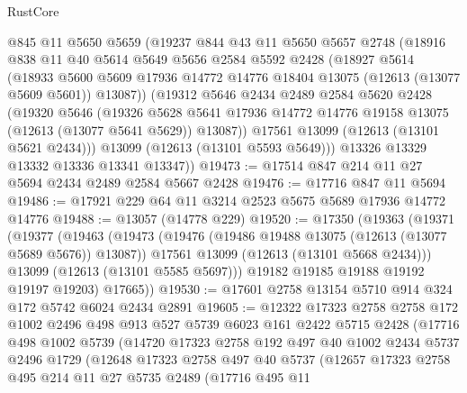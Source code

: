 \begin{lexlean}{RustCore}
\begin{coremodule}
      @845
      @11
      @5650
      @5659
      (@19237
        @844
        @43
        @11
        @5650
        @5657
        @2748
        (@18916
          @838
          @11
          @40
          @5614
          @5649
          @5656
          @2584
          @5592
          @2428
          (@18927
            @5614
            (@18933
              @5600
              @5609
              @17936
              @14772
              @14776
              @18404
              @13075
              (@12613 (@13077 @5609 @5601))
              @13087))
          (@19312
            @5646
            @2434
            @2489
            @2584
            @5620
            @2428
            (@19320
              @5646
              (@19326
                @5628
                @5641
                @17936
                @14772
                @14776
                @19158
                @13075
                (@12613 (@13077 @5641 @5629))
                @13087))
            @17561
            @13099
            (@12613 (@13101 @5621 @2434)))
          @13099
          (@12613 (@13101 @5593 @5649)))
        @13326
        @13329
        @13332
        @13336
        @13341
        @13347))
@19473 := @17514 @847 @214 @11 @27 @5694 @2434 @2489 @2584 @5667 @2428
@19476 := @17716 @847 @11 @5694
@19486 := @17921 @229 @64 @11 @3214 @2523 @5675 @5689 @17936 @14772 @14776
@19488 := @13057 (@14778 @229)
@19520 := @17350
    (@19363
      (@19371
        (@19377
          (@19463
            (@19473
              (@19476 (@19486 @19488 @13075 (@12613 (@13077 @5689 @5676)) @13087))
              @17561
              @13099
              (@12613 (@13101 @5668 @2434)))
            @13099
            (@12613 (@13101 @5585 @5697)))
          @19182
          @19185
          @19188
          @19192
          @19197
          @19203)
        @17665))
@19530 := @17601 @2758 @13154 @5710 @914 @324 @172 @5742 @6024 @2434 @2891
@19605 := @12322
    @17323
    @2758
    @2758
    @172
    @1002
    @2496
    @498
    @913
    @527
    @5739
    @6023
    @161
    @2422
    @5715
    @2428
    (@17716
      @498
      @1002
      @5739
      (@14720
        @17323
        @2758
        @192
        @497
        @40
        @1002
        @2434
        @5737
        @2496
        @1729
        (@12648
          @17323
          @2758
          @497
          @40
          @5737
          (@12657
            @17323
            @2758
            @495
            @214
            @11
            @27
            @5735
            @2489
            (@17716
              @495
              @11

\end{coremodule}
\end{lexlean}
